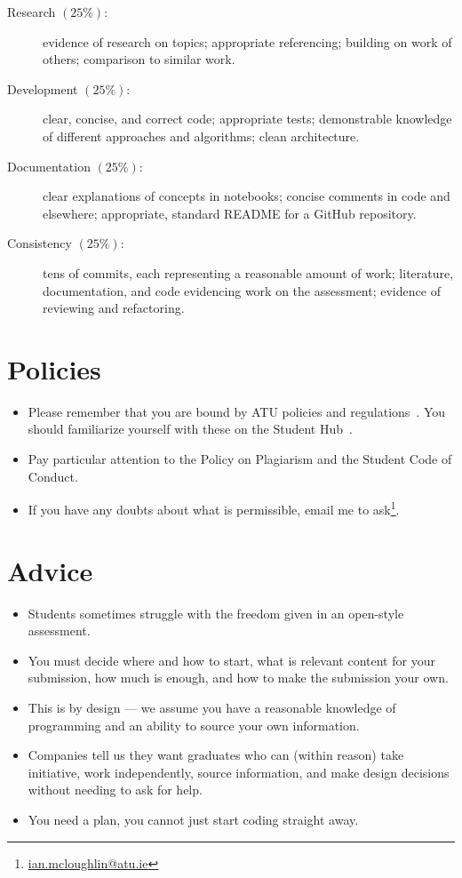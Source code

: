 \documentclass{iansnotes}
\begin{document}
\begin{description}
  \item[Research $(25\%)$:] evidence of research on topics; appropriate referencing; building on work of others; comparison to similar work.
  \item[Development $(25\%)$:] clear, concise, and correct code; appropriate tests; demonstrable knowledge of different approaches and algorithms; clean architecture.
  \item[Documentation $(25\%)$:] clear explanations of concepts in notebooks; concise comments in code and elsewhere; appropriate, standard README for a GitHub repository.
  \item[Consistency $(25\%)$:] tens of commits, each representing a reasonable amount of work; literature, documentation, and code evidencing work on the assessment; evidence of reviewing and refactoring.
\end{description}

\section{Policies}

\begin{itemize}
  \item Please remember that you are bound by ATU policies and regulations~\autocite{atupolicies}. You should familiarize yourself with these on the Student Hub~\autocite{atustudenthub}.
  \item Pay particular attention to the Policy on Plagiarism and the Student Code of Conduct.
  \item If you have any doubts about what is permissible, email me to ask\footnote{\url{ian.mcloughlin@atu.ie}}.
\end{itemize}

\section{Advice}

\begin{itemize}
  \item Students sometimes struggle with the freedom given in an open-style assessment.
  \item You must decide where and how to start, what is relevant content for your submission, how much is enough, and how to make the submission your own.
  \item This is by design --- we assume you have a reasonable knowledge of programming and an ability to source your own information.
  \item Companies tell us they want graduates who can (within reason) take initiative, work independently, source information, and make design decisions without needing to ask for help.
  \item You need a plan, you cannot just start coding straight away.
\end{itemize}
\end{document}
